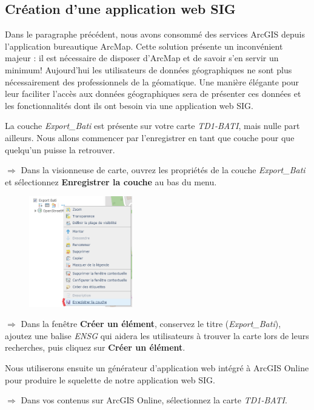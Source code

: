 \documentclass[11pt]{article}
\newcommand{\action}{$\Rightarrow$ }
\begin{document}
\subsection{Création d'une application web SIG}
Dans le paragraphe précédent, nous avons consommé des services ArcGIS depuis l'application bureautique ArcMap. Cette solution présente un inconvénient majeur : il est nécessaire de disposer d'ArcMap et de savoir s'en servir un minimum! Aujourd'hui les utilisateurs de données géographiques ne sont plus nécessairement des professionnels de la géomatique. Une manière élégante pour leur faciliter l'accès aux données géographiques sera de présenter ces données et les fonctionnalités dont ils ont besoin via une application web SIG.

La couche \textit{Export\_Bati} est présente sur votre carte \textit{TD1-BATI}, mais nulle part ailleurs. Nous allons commencer par l'enregistrer en tant que couche pour que quelqu'un puisse la retrouver.

\action Dans la visionneuse de carte, ouvrez les propriétés de la couche \textit{Export\_Bati} et sélectionnez \textbf{Enregistrer la couche} au bas du menu.
\begin{figure}[H]
	\center \includegraphics[width=0.4\textwidth]{img/td1/ago_enregistrer_couche.png} \\
\end{figure}

\action Dans la fenêtre \textbf{Créer un élément}, conservez le titre (\textit{Export\_Bati}), ajoutez une balise \textit{ENSG} qui aidera les utilisateurs à trouver la carte lors de leurs recherches, puis cliquez sur \textbf{Créer un élément}.

Nous utiliserons ensuite un générateur d'application web intégré à ArcGIS Online pour produire le squelette de notre application web SIG.

\action Dans vos contenus sur ArcGIS Online, sélectionnez la carte \textit{TD1-BATI}.
\end{document}
